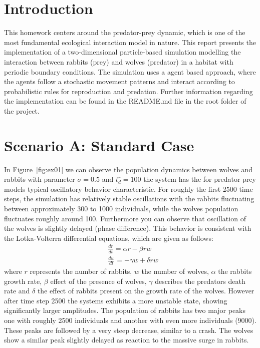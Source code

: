 \section*{Introduction}
This homework centers around the predator-prey dynamic, which is one of the most fundamental ecological interaction model in nature.
This report presents the implementation of a two-dimensional particle-based simulation modelling the interaction between rabbits (prey) and wolves (predator) in a habitat with periodic boundary conditions.
The simulation uses a agent based approach, where the agents follow a stochastic movement patterns and interact according to probabilistic rules for reproduction and predation.
Further information regarding the implementation can be found in the README.md file in the root folder of the project.

\section{Scenario A: Standard Case}
In Figure~\ref{fig:ex01} we can observe the population dynamics between wolves and rabbits with parameter $\sigma = 0.5$ and $t_d^r = 100$ the system has the for predator prey models typical oscillatory behavior characteristic. For roughly the first 2500 time steps, the simulation has relatively stable oscillations with the rabbits fluctuating between approximately 300 to 1000 individuals, while the wolves population fluctuates roughly around 100. Furthermore you can observe that oscillation of the wolves is slightly delayed (phase difference). This behavior is consistent with the Lotka-Volterra differential equations, which are given as follows:
\begin{equation}
	\begin{aligned}
		 & \frac{d r}{d t}=\alpha r-\beta r w   \\
		 & \frac{d w}{d t}=-\gamma w+\delta r w
	\end{aligned}
	\label{eq:lv}
\end{equation}
where $r$ represents the number of rabbits, $w$ the number of wolves, $\alpha$ the rabbits growth rate, $\beta$ effect of the presence of wolves, $\gamma$ describes the predators death rate and $\delta$ the effect of rabbits present on the growth rate of the wolves.
However after time step 2500 the systems exhibits a more unstable state, showing significantly larger amplitudes. The population of rabbits has two major peaks one with roughly 2500 individuals and another with even more individuals (9000). These peaks are followed by a very steep decrease, similar to a crash. The wolves show a similar peak slightly delayed as reaction to the massive surge in rabbits.\newline
